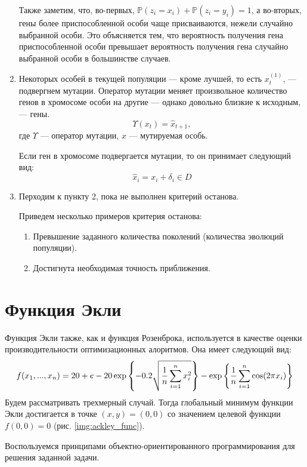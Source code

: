 \begin{enumerate}
Также заметим, что, во-первых, $\mathbb{P}(z_i = x_i) + \mathbb{P}(z_i = y_i) = 1$, а во-вторых, гены более приспособленной особи чаще присваиваются, нежели случайно выбранной особи. Это объясняется тем, что вероятность получения гена приспособленной особи превышает вероятность  получения гена случайно выбранной особи в большинстве случаев.

\item Некоторых особей в текущей популяции --- кроме лучшей, то есть $x_t^{(1)}$, --- подвергнем мутации. Оператор мутации меняет произвольное количество генов в хромосоме особи на другие
 --- однако довольно близкие к исходным, --- гены.
\begin{equation}
	\label{eq:mutation}
	\Upsilon(x_t) = \hat{x}_{t+1},
\end{equation}
где $\Upsilon$ --- оператор мутации, $x$ --- мутируемая особь.

Если ген в хромосоме подвергается мутации, то он принимает следующий вид:
\[
\hat{x}_i
= x_i + \delta_i \in D
\]

\item Перходим к пункту 2, пока не выполнен критерий останова.

	Приведем несколько примеров критерия останова:
	\begin{enumerate}
			\item Превышение заданного количества поколений (количества эволюций популяции).
		\item Достигнута необходимая точность приближения.
	\end{enumerate}
\end{enumerate}

\section{Функция Экли}
\noindent
Функция Экли также, как и функция Розенброка, используется в качестве оценки производительности оптимизационных алоритмов. Она имеет следующий вид:
 \[
 	f(x_1, ..., x_n)
	=
	20
	+
	e
	-20\exp\left\{-0.2
	\sqrt{\dfrac{1}{n}
	\sum_{i=1}^n \limits x^2_i}
	\right\}
	-
	\exp\left\{
	\dfrac{1}{n}
	\sum_{i=1}^n \limits
	\cos(2\pi x_i)
	\right\}
 \]
 Будем рассматривать трехмерный случай. Тогда глобальный минимум функции Экли достигается в точке $(x, y) = (0, 0)$ со значением целевой функции $f(0, 0) = 0$ (рис. \ref{img:ackley_func}).

Воспользуемся принципами объектно-ориентированного программирования для решения заданной задачи.

